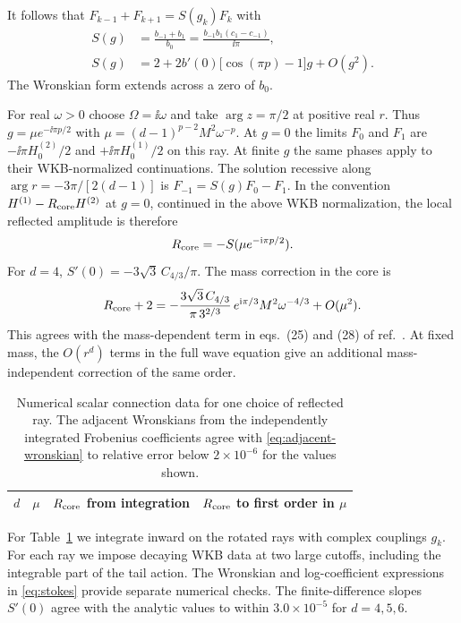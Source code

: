 It follows that \(F_{k-1}+F_{k+1}=S(g_k)F_k\) with
\begin{align}
 S(g)&=\frac{b_{-1}+b_1}{b_0}
       =\frac{b_{-1}b_1(c_1-c_{-1})}{\ii\pi},\\
 S(g)&=2+2b'(0)\big[\cos(\pi p)-1\big]g+O(g^2).
 \label{eq:stokes}
\end{align}
The Wronskian form extends across a zero of \(b_0\).

For real \(\omega>0\) choose \(\Omega=\ii\omega\) and take \(\arg z=\pi/2\) at positive real \(r\). Thus \(g=\mu e^{-\ii\pi p/2}\) with \(\mu=(d-1)^{p-2}M^2\omega^{-p}\). At \(g=0\) the limits \(F_0\) and \(F_1\) are \(-\ii\pi H_0^{(2)}/2\) and \(+\ii\pi H_0^{(1)}/2\) on this ray. At finite \(g\) the same phases apply to their WKB-normalized continuations. The solution recessive along \(\arg r=-3\pi/[2(d-1)]\) is \(F_{-1}=S(g)F_0-F_1\). In the convention \(H^{(1)}-R_{\rm core}H^{(2)}\) at \(g=0\), continued in the above WKB normalization, the local reflected amplitude is therefore
\begin{equation}
 R_{\rm core}=-S(\mu e^{-\mathrm{i}\pi p/2}).
 \label{eq:reflected}
\end{equation}
For \(d=4\), \(S'(0)=-3\sqrt 3\,C_{4/3}/\pi\). The mass correction in the core is
\begin{equation}
 R_{\rm core}+2=-\frac{3\sqrt{3}\,C_{4/3}}{\pi\,3^{2/3}}\,
       e^{\mathrm{i}\pi/3} M^2\omega^{-4/3}+O(\mu^2).
\end{equation}
This agrees with the mass-dependent term in eqs.~(25) and (28) of ref.~\cite{AfkhamiJeddi:2025}. At fixed mass, the \(O(r^d)\) terms in the full wave equation give an additional mass-independent correction of the same order.

\begin{table}[t]
 \centering
 \small
 \begin{tabular}{cccc}
 \hline
 \(d\) & \(\mu\) & \(R_{\rm core}\) from integration & \(R_{\rm core}\) to first order in \(\mu\) \\
 \hline
 
 \end{tabular}
 \caption{Numerical scalar connection data for one choice of reflected ray.
 The adjacent Wronskians from the independently integrated Frobenius
 coefficients agree with \eqref{eq:adjacent-wronskian} to relative error below
 \(2\times10^{-6}\) for the values shown.}
 \label{tab:connection}
\end{table}

For Table~\ref{tab:connection} we integrate inward on the rotated rays with complex couplings \(g_k\). For each ray we impose decaying WKB data at two large cutoffs, including the integrable part of the tail action. The Wronskian and log-coefficient expressions in \eqref{eq:stokes} provide separate numerical checks. The finite-difference slopes \(S'(0)\) agree with the analytic values to within \(3.0\times10^{-5}\) for \(d=4,5,6\).

